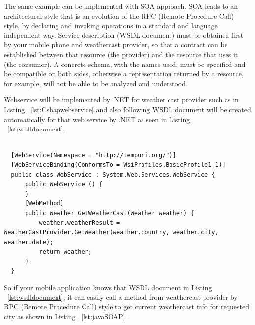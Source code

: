 The same example can be implemented with SOA approach. SOA leads to an architectural style that is an evolution of the RPC (Remote Procedure Call) style, by declaring and invoking operations in a standard and language independent way. Service description (WSDL document) must be obtained first by your mobile phone and weathercast provider, so that a contract can be established between that resource (the provider) and the resource that uses it (the consumer). A concrete schema, with the names used, must be specified and be compatible on both sides, otherwise a representation returned by a resource, for example, will not be able to be analyzed and understood.

Webservice will be implemented by .NET for weather cast provider such as in Listing ~\ref{lst:Cshapwebservice} and also following WSDL document will be created automatically for that web service by .NET as seen in Listing ~\ref{lst:wsdldocument}.

\begin{lstlisting}[caption=SOAP Web Service with .Net, label=lst:Cshapwebservice]

  [WebService(Namespace = "http://tempuri.org/")]
  [WebServiceBinding(ConformsTo = WsiProfiles.BasicProfile1_1)]
  public class WebService : System.Web.Services.WebService {
      public WebService () {
      }
      [WebMethod]
      public Weather GetWeatherCast(Weather weather) {
          weather.weatherResult = WeatherCastProvider.GetWeather(weather.country, weather.city, weather.date);
          return weather;
      }
  }
\end{lstlisting}

So if your mobile application knows that WSDL document in Listing ~\ref{lst:wsdldocument}, it can easily call a method from weathercast provider by RPC (Remote Procedure Call) style to get current weathercast info for requested city as shown in Listing ~\ref{lst:javaSOAP}.

